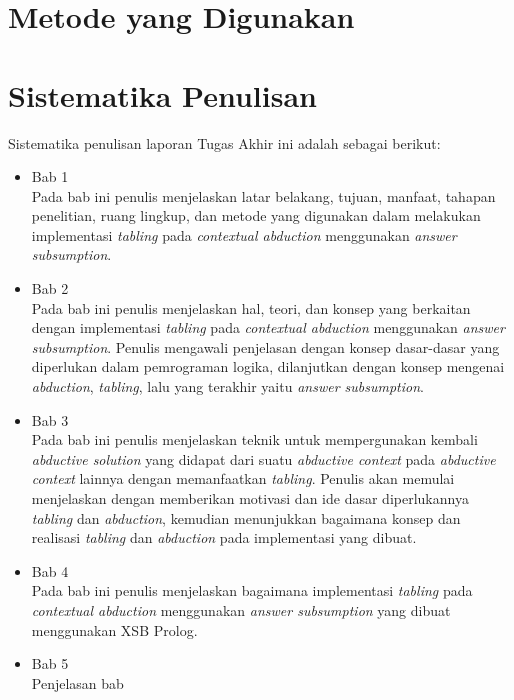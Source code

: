 \section{Metode yang Digunakan}

\section{Sistematika Penulisan}
Sistematika penulisan laporan Tugas Akhir ini adalah sebagai berikut:
\begin{itemize}
	\item Bab 1 \babSatu \\
	Pada bab ini penulis menjelaskan latar belakang, tujuan, manfaat, tahapan penelitian, ruang lingkup, dan metode yang digunakan dalam melakukan implementasi \textit{tabling} pada \textit{contextual abduction} menggunakan \textit{answer subsumption}.
	\item Bab 2 \babDua \\
	Pada bab ini penulis menjelaskan hal, teori, dan konsep yang berkaitan dengan implementasi \textit{tabling} pada \textit{contextual abduction} menggunakan \textit{answer subsumption}. Penulis mengawali penjelasan dengan konsep dasar-dasar yang diperlukan dalam pemrograman logika, dilanjutkan dengan konsep mengenai \textit{abduction}, \textit{tabling}, lalu yang terakhir yaitu \textit{answer subsumption}.
	\item Bab 3 \babTiga \\
	Pada bab ini penulis menjelaskan teknik untuk mempergunakan kembali \textit{abductive solution} yang didapat dari suatu \textit{abductive context} pada \textit{abductive context} lainnya dengan memanfaatkan \textit{tabling}. Penulis akan memulai menjelaskan dengan memberikan motivasi dan ide dasar diperlukannya \textit{tabling} dan \textit{abduction}, kemudian menunjukkan bagaimana konsep dan realisasi \textit{tabling} dan \textit{abduction} pada implementasi yang dibuat.
	\item Bab 4 \babEmpat \\
	Pada bab ini penulis menjelaskan bagaimana implementasi \textit{tabling} pada \textit{contextual abduction} menggunakan \textit{answer subsumption} yang dibuat menggunakan XSB Prolog.
	\item Bab 5 \babLima \\
	Penjelasan bab 
\end{itemize}
